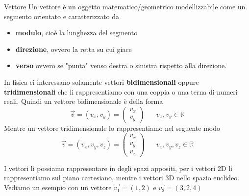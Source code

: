 \documentclass{rapport}
\begin{document}
  \begin{definizione}{Vettore}{}
    Un vettore è un oggetto matematico/geometrico modellizzabile come un segmento orientato e caratterizzato da 
    \begin{itemize}
      \item \textbf{modulo}, cioè la lunghezza del segmento
      \item \textbf{direzione}, ovvero la retta su cui giace
      \item \textbf{verso} ovvero se "punta" venso destra o sinistra rispetto alla direzione.
    
    \end{itemize}

    In fisica ci interessano solamente vettori \textbf{bidimensionali} oppure \textbf{tridimensionali} che li rappresentiamo con una coppia o una terna di numeri reali. Quindi un vettore bidimensionale è della forma
    \[
    \vec{v} = (v_x, v_y) = \begin{pmatrix}
      v_x \\
      v_y
    \end{pmatrix}
    \;\;\;\;\;\; v_x, v_y \in \mathbb{R}
    \] 
    Mentre un vettore tridimensionale lo rappresentiamo nel seguente modo
    \[
    \vec{v} = (v_x, v_y, v_z) = \begin{pmatrix}
      v_x \\
      v_y\\
      v_z
    \end{pmatrix}
    \;\;\;\;\;\; v_x, v_y, v_z \in \mathbb{R}
    \] 
  \end{definizione}
  I vettori li possiamo rappresentare in degli spazi appositi, per i vettori 2D li rappresentiamo sul piano cartesiano, mentre i vettori 3D nello spazio euclideo. Vediamo un esempio con un vettore $\vec{v_1} = (1,2)$ e $\vec{v_2} = (3,2,4)$ 
\end{document}
